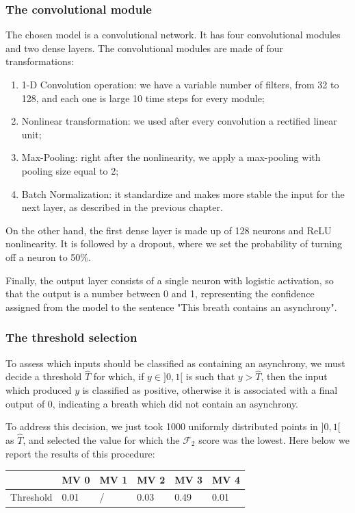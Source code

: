 \documentclass[a4paper, twoside]{article}
\begin{document}
\subsubsection{The convolutional module}

The chosen model is a convolutional network. It has four convolutional modules and two dense layers. The convolutional modules are made of four transformations:
\begin{enumerate}
    \item 1-D Convolution operation: we have a variable number of filters, from 32 to 128, and each one is large 10 time steps for every module;
    \item Nonlinear transformation: we used after every convolution a rectified linear unit;
    \item Max-Pooling: right after the nonlinearity, we apply a max-pooling with pooling size equal to 2;
    \item Batch Normalization: it standardize and makes more stable the input for the next layer, as described in the previous chapter.
\end{enumerate}

On the other hand, the first dense layer is made up of 128 neurons and ReLU nonlinearity. It is followed by a dropout, where we set the probability of turning off a neuron to 50\%.

Finally, the output layer consists of a single neuron with logistic activation, so that the output is a number between 0 and 1, representing the confidence assigned from the model to the sentence "This breath contains an asynchrony".

\subsubsection{The threshold selection}
To assess which inputs should be classified as containing an asynchrony, we must decide a threshold $\hat{T}$ for which, if $y \in ]0, 1[$ is such that $y > \hat{T}$, then the input which produced $y$ is classified as positive, otherwise it is associated with a final output of $0$, indicating a breath which did not contain an asynchrony.

To address this decision, we just took 1000 uniformly distributed points in $]0, 1[$ as $\hat{T}$, and selected the value for which the $\mathcal{F}_2$ score was the lowest. Here below we report the results of this procedure:


\begin{table}[H]
\begin{tabular}{l|l|l|l|l|l|}
\cline{2-6}
                                & MV 0 & MV 1 & MV 2  & MV 3 & MV 4 \\ \hline
\multicolumn{1}{|l|}{Threshold} & 0.01 &  /   & 0.03 & 0.49 & 0.01 \\ \hline
\end{tabular}
\end{table}
\end{document}
